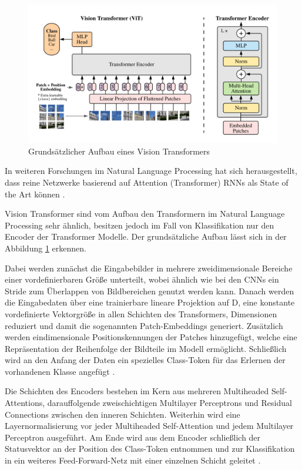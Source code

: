 \documentclass[twoside,a4paper]{IEEEtran}
\begin{document}
\begin{figure}[!htb]
	\centering
	\includegraphics[width=2.1\columnwidth]{vitimg}
	\caption{Grundsätzlicher Aufbau eines Vision Transformers \cite[S.3]{VIT}}
	\label{vitimg}
\end{figure}


In weiteren Forschungen im Natural Language Processing hat sich herausgestellt, dass reine Netzwerke basierend auf Attention (Transformer) RNNs als State of the Art können \cite[S.2]{TRANSFORMERS}. 

Vision Transformer sind vom Aufbau den Transformern im Natural Language Processing sehr ähnlich, besitzen jedoch im Fall von Klassifikation nur den Encoder der Transformer Modelle. Der grundsätzliche Aufbau lässt sich in der Abbildung \ref{vitimg} erkennen.

Dabei werden zunächst die Eingabebilder in mehrere zweidimensionale Bereiche einer vordefinierbaren Größe unterteilt, wobei ähnlich wie bei den CNNs ein Stride zum Überlappen von Bildbereichen genutzt werden kann. Danach werden die Eingabedaten über eine trainierbare lineare Projektion auf D, eine konstante vordefinierte Vektorgröße in allen Schichten des Transformers, Dimensionen reduziert und damit die sogenannten Patch-Embeddings generiert. Zusätzlich werden eindimensionale Positionskennungen der Patches hinzugefügt, welche eine Repräsentation der Reihenfolge der Bildteile im Modell ermöglicht. Schließlich wird an den Anfang der Daten ein spezielles Class-Token für das Erlernen der vorhandenen Klasse angefügt \cite[S.3]{VIT}. 

Die Schichten des Encoders bestehen im Kern aus mehreren Multiheaded Self-Attentions, darauffolgende zweischichtigen Multilayer Perceptrons und Residual Connections zwischen den inneren Schichten. Weiterhin wird eine Layernormalisierung vor jeder Multiheaded Self-Attention und jedem Multilayer Perceptron ausgeführt. Am Ende wird aus dem Encoder schließlich der Statusvektor an der Position des Class-Token entnommen und zur Klassifikation in ein weiteres Feed-Forward-Netz mit einer einzelnen Schicht geleitet \cite[S.3-4]{VIT}. 
\end{document}
